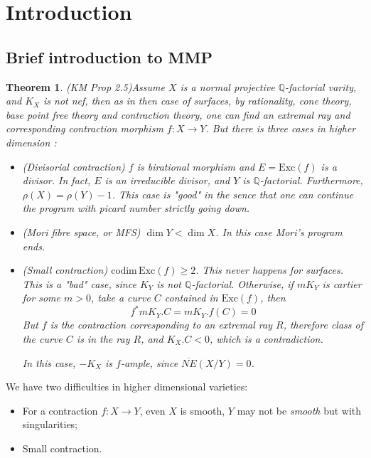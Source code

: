 \documentclass{article}
\newtheorem{thm}[defn]{Theorem}
\begin{document}
\section{Introduction}

\subsection{Brief introduction to MMP}
\begin{thm}
  (KM Prop 2.5)Assume $ X $ is a normal projective $ \mathbb{Q} $-factorial varity, and $ K_X $ is not nef, then as in then case of surfaces, by rationality, cone theory, base point free theory and contraction theory, one can find an extremal ray and corresponding contraction morphism $ f:X\to Y $. But there is three cases in higher dimension :
  \begin{itemize}
    \item (Divisorial contraction) $ f $ is birational morphism and $ E=\mathrm{Exc} (f) $ is a divisor. In fact, $ E $ is an irreducible divisor, and $ Y $ is $ \mathbb{Q} $-factorial. Furthermore, $ \rho(X)=\rho(Y)-1 $. This case is "good" in the sence that one can continue the program with picard number strictly going down.
    \item (Mori fibre space, or MFS) $ \dim Y<\dim X $. In this case Mori's program ends.
    \item (Small contraction) $ \mathrm{codim}\,\mathrm{Exc}(f)\geqslant 2 $. This never happens for surfaces.  This is a "bad" case, since $ K_Y $ is not $ \mathbb{Q} $-factorial. Otherwise, if $ mK_Y $ is cartier for some $ m>0 $, take a curve $ C $ contained in $ \mathrm{Exc}(f) $, then
    \[ f^*mK_Y .C=mK_Y.f(C)=0\]
    But $ f $ is the contraction corresponding to an extremal ray $ R $, therefore class of the curve $ C $ is in the ray $ R $, and $ K_X.C<0 $, which is a contradiction.
    
    In this case, $ -K_X $ is $ f $-ample, since $ \overline{NE}(X/Y)=0 $.
  \end{itemize}
\end{thm}

We have two difficulties in higher dimensional varieties:
\begin{itemize}
  \item For a contraction $ f:X\to Y $, even $ X $ is smooth, $ Y $ may not be \emph{smooth} but with singularities;
  \item Small contraction.
\end{itemize}
\end{document}
